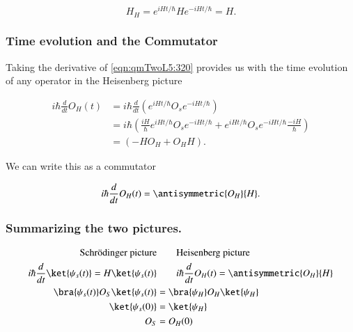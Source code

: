 \begin{equation}\label{eqn:qmTwoL5:360}
H_H = e^{i H t/\hbar} H e^{-i H t/\hbar} = H.
\end{equation}

\subsubsection{Time evolution and the Commutator}

Taking the derivative of \ref{eqn:qmTwoL5:320} provides us with the time evolution of any operator in the Heisenberg picture

\begin{align*}
i \hbar \frac{d}{dt} O_H(t) 
&=
i \hbar \frac{d}{dt} \left( 
e^{i H t/\hbar} O_s e^{-i H t/\hbar}
\right) \\
&=
i \hbar \left( 
\frac{i H}{\hbar} e^{i H t/\hbar} O_s e^{-i H t/\hbar}
+
e^{i H t/\hbar} O_s e^{-i H t/\hbar} \frac{-i H}{\hbar} 
\right) \\
&=
\left( 
-H O_H
+
O_H H
\right).
\end{align*}

We can write this as a commutator

\begin{equation}\label{eqn:qmTwoL5:380}
i \hbar \frac{d}{dt} O_H(t) = \antisymmetric{O_H}{H}.
\end{equation}

\subsubsection{Summarizing the two pictures.}

\begin{align*}
\text{Schr\"{o}dinger picture} &\qquad \text{Heisenberg picture} \\
i \hbar \frac{d}{dt} \ket{\psi_s(t)} = H \ket{\psi_s(t)} &\qquad i \hbar \frac{d}{dt} O_H(t) = \antisymmetric{O_H}{H} \\
\bra{\psi_s(t)} O_S \ket{\psi_s(t)} &= \bra{\psi_H} O_H \ket{\psi_H} \\
\ket{\psi_s(0)} &= \ket{\psi_H} \\
O_S &= O_H(0)
\end{align*}

\EndArticle
